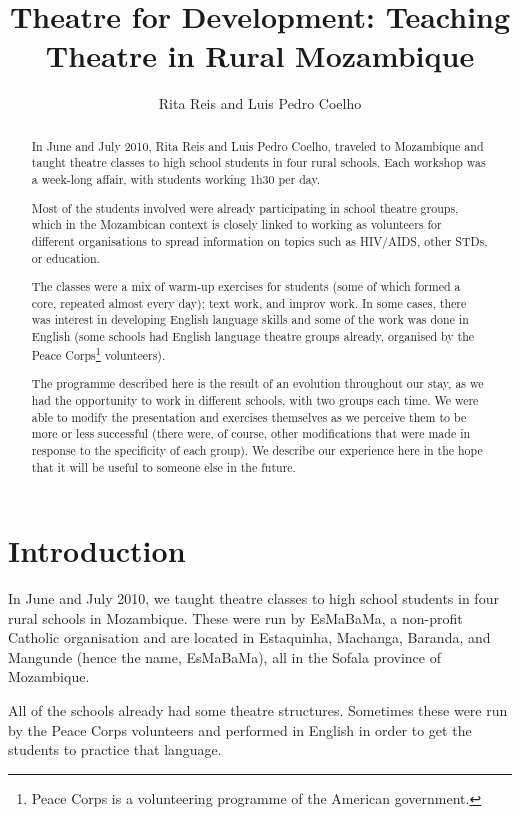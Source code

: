 \documentclass[article,twocolumn,twoside]{memoir}
\title{Theatre for Development: Teaching Theatre in Rural Mozambique}
\author{Rita Reis and Luis Pedro Coelho}
\begin{document}
\maketitle

\begin{abstract}
In June and July 2010, Rita Reis and Luis Pedro Coelho, traveled to Mozambique
and taught theatre classes to high school students in four rural schools. Each
workshop was a week-long affair, with students working 1h30 per day.

Most of the students involved were already participating in school theatre
groups, which in the Mozambican context is closely linked to working as
volunteers for different organisations to spread information on topics such as
HIV/AIDS, other STDs, or education.

The classes were a mix of warm-up exercises for students (some of which formed
a core, repeated almost every day); text work, and improv work. In some cases,
there was interest in developing English language skills and some of the work
was done in English (some schools had English language theatre groups already,
organised by the Peace Corps\footnote{Peace Corps is a volunteering programme
of the American government.} volunteers).

The programme described here is the result of an evolution throughout our stay,
as we had the opportunity to work in different schools, with two groups each
time. We were able to modify the presentation and exercises themselves as we
perceive them to be more or less successful (there were, of course, other
modifications that were made in response to the specificity of each group). We
describe our experience here in the hope that it will be useful to someone else
in the future.

\end{abstract}

\chapter{Introduction}
In June and July 2010, we taught theatre classes to high school students in
four rural schools in Mozambique. These were run by EsMaBaMa, a non-profit
Catholic organisation and are located in Estaquinha, Machanga, Baranda, and
Mangunde (hence the name, EsMaBaMa), all in the Sofala province of Mozambique.

All of the schools already had some theatre structures. Sometimes these were
run by the Peace Corps volunteers and performed in English in order to get the
students to practice that language.
\end{document}
